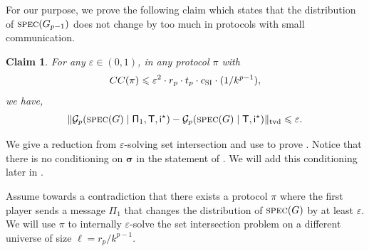 \documentclass[11pt]{article}
\newtheorem{claim}[lemma]{Claim}
\theoremstyle{definition}
\renewcommand{\leq}{\leqslant}
\newcommand{\tvd}[2]{\ensuremath{\norm{#1 - #2}_{\mathrm{tvd}}}}
\newcommand{\eps}{\ensuremath{\varepsilon}}
\newcommand{\norm}[1]{\ensuremath{\|#1\|}}
\newcommand{\rv}[1]{\ensuremath{{\mathsf{#1}}}\xspace}
\newcommand{\cG}{\ensuremath{\mathcal{G}}}
\newcommand{\spec}{\ensuremath{\textnormal{\textsc{spec}}}}
\newcommand{\prot}{\ensuremath{\pi}}
\newcommand{\Prot}{\ensuremath{\Pi}}
\newcommand{\rProt}{\ensuremath{\rv{\Prot}}}
\newcommand{\rT}{\ensuremath{\rv{T}}}
\newcommand{\rsigma}{\ensuremath{\bm{\sigma}}}
\begin{document}
	For our purpose, we prove the following claim which states that the distribution of $\spec(G_{p-1})$ does not change by too much in protocols with small communication.

	\begin{claim}\label{clm:set-int-hard-basic}
		For any $\eps \in (0,1)$, in any protocol $\prot$ with  $$CC(\prot) \leq \eps^2 \cdot r_p \cdot t_p \cdot \cSI \cdot (1/k^{p-1}),$$ 
		we have, 
		\[
		\tvd{\cG_p(\spec(G) \mid \rProt_1,  \rT, \ristar)}{\cG_p(\spec(G) \mid  \rT, \ristar)} \leq \eps.
		\]
	\end{claim}
	
	We give a reduction from $\eps$-solving set intersection and use  to prove . Notice that there is no conditioning on $\rsigma$ in the statement of . We will add this conditioning later in . %
	
	Assume towards a contradiction that there exists a protocol $\prot$ where the first player sends a message $\Prot_1$ that changes the distribution of $\spec(G)$ by at least $\eps$. We will use $\prot$ to internally $\eps$-solve the set intersection problem on a different universe of size $\ell = r_p / k^{p-1}$. 
\end{document}
